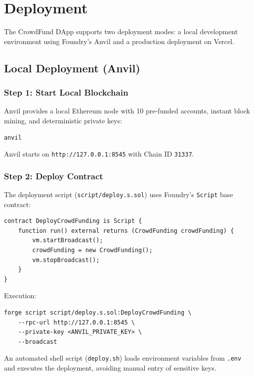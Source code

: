 \section{Deployment}
\label{sec:deployment}

The CrowdFund DApp supports two deployment modes: a local development environment using Foundry's Anvil and a production deployment on Vercel.

\subsection{Local Deployment (Anvil)}

\subsubsection{Step 1: Start Local Blockchain}

Anvil provides a local Ethereum node with 10 pre-funded accounts, instant block mining, and deterministic private keys:

\begin{lstlisting}[language={}, caption={Starting Anvil}]
anvil
\end{lstlisting}

Anvil starts on \texttt{http://127.0.0.1:8545} with Chain ID \texttt{31337}.

\subsubsection{Step 2: Deploy Contract}

The deployment script (\texttt{script/deploy.s.sol}) uses Foundry's \texttt{Script} base contract:

\begin{lstlisting}[language=Solidity, caption={Deployment Script}]
contract DeployCrowdFunding is Script {
    function run() external returns (CrowdFunding crowdFunding) {
        vm.startBroadcast();
        crowdFunding = new CrowdFunding();
        vm.stopBroadcast();
    }
}
\end{lstlisting}

Execution:
\begin{lstlisting}[language={}, caption={Deploy Command}]
forge script script/deploy.s.sol:DeployCrowdFunding \
    --rpc-url http://127.0.0.1:8545 \
    --private-key <ANVIL_PRIVATE_KEY> \
    --broadcast
\end{lstlisting}

An automated shell script (\texttt{deploy.sh}) loads environment variables from \texttt{.env} and executes the deployment, avoiding manual entry of sensitive keys.

